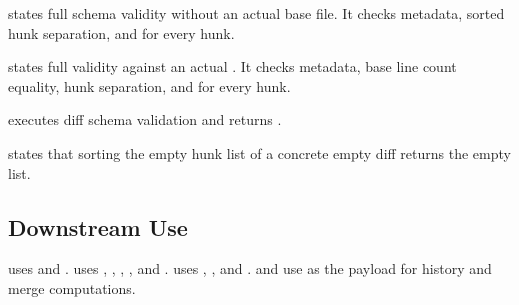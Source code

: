 \begin{definition}
 states full schema validity without an actual
base file. It checks metadata, sorted hunk separation, and
 for every hunk.
\end{definition}

\begin{definition}
 states full validity against an actual .
It checks metadata, base line count equality, hunk separation, and
 for every hunk.
\end{definition}

\begin{definition}
 executes diff schema validation and returns
.
\end{definition}

\begin{theorem}
 states that sorting the empty hunk list of a
concrete empty diff returns the empty list.
\end{theorem}

\subsection{Downstream Use}

 uses  and .
 uses , ,
, , and
.  uses , ,
and .  and  use
 as the payload for history and merge computations.
